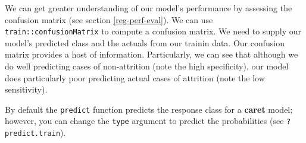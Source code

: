 \documentclass[]{book}
\newenvironment{Shaded}{\begin{snugshade}}{\end{snugshade}}
\newcommand{\CommentTok}[1]{\textcolor[rgb]{0.56,0.35,0.01}{\textit{#1}}}
\newcommand{\DataTypeTok}[1]{\textcolor[rgb]{0.13,0.29,0.53}{#1}}
\newcommand{\KeywordTok}[1]{\textcolor[rgb]{0.13,0.29,0.53}{\textbf{#1}}}
\newcommand{\NormalTok}[1]{#1}
\newcommand{\OperatorTok}[1]{\textcolor[rgb]{0.81,0.36,0.00}{\textbf{#1}}}
\newcommand{\StringTok}[1]{\textcolor[rgb]{0.31,0.60,0.02}{#1}}
\theoremstyle{definition}
\theoremstyle{definition}
\theoremstyle{definition}
\theoremstyle{remark}
\begin{document}
We can get greater understanding of our model's performance by assessing
the confusion matrix (see section \ref{reg-perf-eval}). We can use
\texttt{train::confusionMatrix} to compute a confusion matrix. We need
to supply our model's predicted class and the actuals from our trainin
data. Our confusion matrix provides a host of information. Particularly,
we can see that although we do well predicting cases of non-attrition
(note the high specificity), our model does particularly poor predicting
actual cases of attrition (note the low sensitivity).

\begin{tip}
By default the \texttt{predict} function predicts the response class for
a \textbf{caret} model; however, you can change the \texttt{type}
argument to predict the probabilities (see \texttt{?predict.train}).
\end{tip}

\begin{Shaded}
\end{Shaded}
\end{document}
